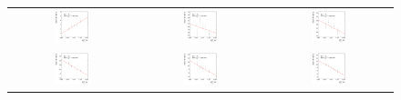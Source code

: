 \begin{figure}[ht]
  \centering
  \begin{tabular}{ccc}
    \includegraphics[width=0.3\textwidth]{figures/ResFit_Spring10QCDFlat_CB_Eta0_ExtrapolatedPar1_PtBin0} &
    \includegraphics[width=0.3\textwidth]{figures/ResFit_Spring10QCDFlat_CB_Eta0_ExtrapolatedPar1_PtBin1} &
    \includegraphics[width=0.3\textwidth]{figures/ResFit_Spring10QCDFlat_CB_Eta0_ExtrapolatedPar1_PtBin2} \\

    \includegraphics[width=0.3\textwidth]{figures/ResFit_Spring10QCDFlat_CB_Eta0_ExtrapolatedPar1_PtBin3} &
    \includegraphics[width=0.3\textwidth]{figures/ResFit_Spring10QCDFlat_CB_Eta0_ExtrapolatedPar1_PtBin4} &
    \includegraphics[width=0.3\textwidth]{figures/ResFit_Spring10QCDFlat_CB_Eta0_ExtrapolatedPar1_PtBin5} \\


\end{tabular}
\end{figure}
